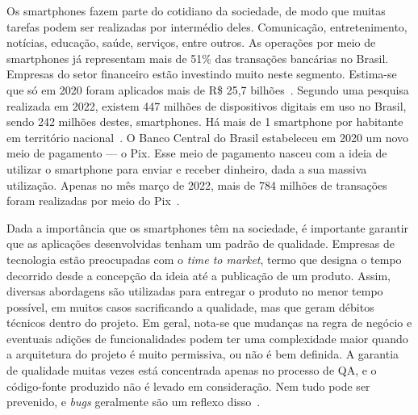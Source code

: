 Os smartphones fazem parte do cotidiano da sociedade, de modo que muitas tarefas podem ser realizadas por intermédio deles.
Comunicação, entretenimento, notícias, educação, saúde, serviços, entre outros.
As operações por meio de smartphones já representam mais de 51\% das transações bancárias no Brasil.
Empresas do setor financeiro estão investindo muito neste segmento.
Estima-se que só em 2020 foram aplicados mais de R\$ 25,7 bilhões~\cite{febraban-data}.
Segundo uma pesquisa realizada em 2022, existem 447 milhões de dispositivos digitais em uso no Brasil, sendo 242 milhões destes, smartphones.
Há mais de 1 smartphone por habitante em território nacional~\cite{it-usage-data}.
O Banco Central do Brasil estabeleceu em 2020 um novo meio de pagamento — o Pix.
Esse meio de pagamento nasceu com a ideia de utilizar o smartphone para enviar e receber dinheiro, dada a sua massiva utilização.
Apenas no mês março de 2022, mais de 784 milhões de transações foram realizadas por meio do Pix~\cite{pix-statistics}.

Dada a importância que os smartphones têm na sociedade, é importante garantir que as aplicações desenvolvidas tenham um padrão de qualidade.
Empresas de tecnologia estão preocupadas com o \emph{time to market}, termo que designa o tempo decorrido desde a concepção da ideia até a publicação de um produto.
Assim, diversas abordagens são utilizadas para entregar o produto no menor tempo possível, em muitos casos sacrificando a qualidade, mas que geram débitos técnicos dentro do projeto.
Em geral, nota-se que mudanças na regra de negócio e eventuais adições de funcionalidades podem ter uma complexidade maior quando a arquitetura do projeto é muito permissiva, ou não é bem definida.
A garantia de qualidade muitas vezes está concentrada apenas no processo de QA, e o código-fonte produzido não é levado em consideração.
Nem tudo pode ser prevenido, e \emph{bugs} geralmente são um reflexo disso~\cite{quality-standards-paper}.